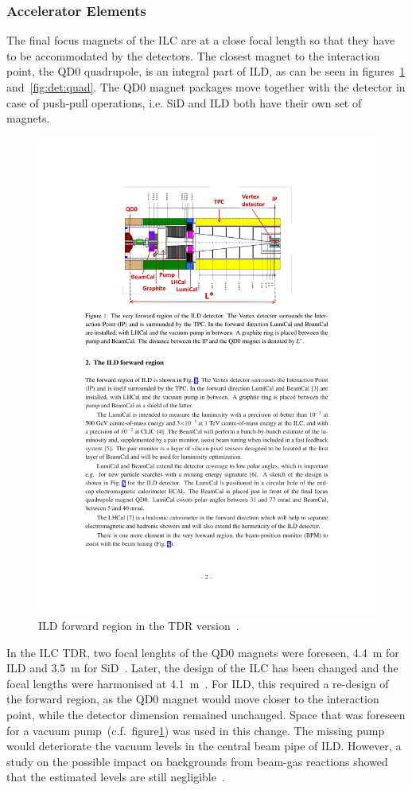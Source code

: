 \subsubsection{Accelerator Elements}
The final focus magnets of the ILC are at a close focal length so that they have to be accommodated by the detectors. The closest magnet to the interaction point, the QD0 quadrupole, is an integral part of ILD, as can be seen in figures~\ref{ild:fig:Forward_QD0} and~\ref{fig:det:quad}. The QD0 magnet packages move together with the detector in case of push-pull operations, i.e. SiD and ILD both have their own set of magnets.
\begin{figure}[h!]
\centering
\includegraphics[width=0.8\hsize]{ILC/figs/Forward_Region_QD0.pdf}
\caption{\label{ild:fig:Forward_QD0}ILD forward region in the TDR version~\cite{Levy:2017urt}.}
\end{figure}
In the ILC TDR, two focal lenghts of the QD0 magnets were foreseen, 4.4~m for ILD and 3.5~m for SiD~\cite{Behnke:2013xla}. Later, the design of the ILC has been changed and the focal lengths were harmonised at 4.1~m~\cite{ild:bib:lstar_cr}. For ILD, this required a re-design of the forward region, as the QD0 magnet would move closer to the interaction point, while the detector dimension remained unchanged. Space that was foreseen for a vacuum pump~(c.f.~figure\ref{ild:fig:Forward_QD0}) was used in this change. The missing pump would deteriorate the vacuum levels in the central beam pipe of ILD. However, a study on the possible impact on backgrounds from beam-gas reactions showed that the estimated levels are still negligible~\cite{ild:bib:beam_gas}.